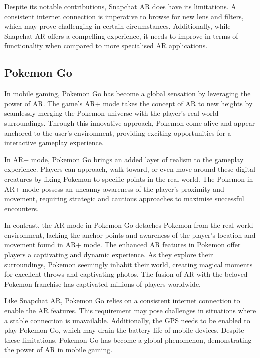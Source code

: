 Despite its notable contributions, Snapchat \ac{AR} does have its limitations. A consistent internet connection is imperative to browse for new lens and filters, which may prove challenging in certain circumstances. Additionally, while Snapchat \ac{AR} offers a compelling experience, it needs to improve in terms of functionality when compared to more specialised \ac{AR} applications.

\subsection*{Pokemon Go}
In mobile gaming, Pokemon Go has become a global sensation by leveraging the power of \ac{AR}. The game's \ac{AR}+\cite{AR+} mode takes the concept of \ac{AR} to new heights by seamlessly merging the Pokemon universe with the player's real-world surroundings. Through this innovative approach, Pokemon come alive and appear anchored to the user's environment, providing exciting opportunities for a interactive gameplay experience.

In \ac{AR}+ mode, Pokemon Go brings an added layer of realism to the gameplay experience. Players can approach, walk toward, or even move around these digital creatures by fixing Pokemon to specific points in the real world. The Pokemon in \ac{AR}+ mode possess an uncanny awareness of the player's proximity and movement, requiring strategic and cautious approaches to maximise successful encounters.

In contrast, the \ac{AR} mode in Pokemon Go detaches Pokemon from the real-world environment, lacking the anchor points and awareness of the player's location and movement found in AR+ mode.
The enhanced \ac{AR} features in Pokemon offer players a captivating and dynamic experience. As they explore their surroundings, Pokemon seemingly inhabit their world, creating magical moments for excellent throws and captivating photos. The fusion of \ac{AR} with the beloved Pokemon franchise has captivated millions of players worldwide.

Like Snapchat AR, Pokemon Go relies on a consistent internet connection to enable the \ac{AR} features. This requirement may pose challenges in situations where a stable connection is unavailable. Additionally, the GPS needs to be enabled to play Pokemon Go, which may drain the battery life of mobile devices. Despite these limitations, Pokemon Go has become a global phenomenon, demonstrating the power of \ac{AR} in mobile gaming.


